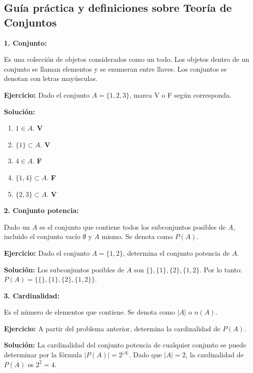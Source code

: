 \documentclass[11pt, a4paper]{article}
\begin{document}
  \subsection{Guía práctica y definiciones sobre Teoría de Conjuntos}
  \begin{multicols}{2}
    \begin{center}
      \textbf{1. Conjunto:}
    \end{center}
    Es una colección de objetos considerados como un todo. Los objetos dentro de un conjunto se llaman elementos y se enumeran entre llaves. Los conjuntos se denotan con letras mayúsculas.

    \textbf{Ejercicio:} Dado el conjunto \( A = \{1, 2, 3\} \), marca V o F según corresponda.

    \textbf{Solución:} 
    \begin{enumerate}
      \item \( 1 \in A \). \quad \textbf{V}
    \item \( \{1\} \subset A \). \quad \textbf{V}
    \item \( 4 \in A \). \quad \textbf{F}
    \item \( \{1, 4\} \subset A \). \quad \textbf{F}
    \item \( \{2, 3\} \subset A \). \quad \textbf{V}
  \end{enumerate}

    \begin{center}
      \textbf{2. Conjunto potencia:}
    \end{center}
    Dado un \( A \) es el conjunto que contiene todos los subconjuntos posibles de \( A \), incluido el conjunto vacío $\emptyset$ y \( A \) mismo. Se denota como \( P(A) \).
  
    \textbf{Ejercicio:} Dado el conjunto \( A = \{1, 2\} \), determina el conjunto potencia de \( A \).
  
    \textbf{Solución:} Los subconjuntos posibles de \( A \) son \( \{\}, \{1\}, \{2\}, \{1, 2\} \). Por lo tanto: \( P(A) = \{\{\}, \{1\}, \{2\}, \{1, 2\}\} \).

    \begin{center}
      \textbf{3. Cardinalidad:}
    \end{center}
    Es el número de elementos que contiene. Se denota como \( |A| \) o \( n(A) \).
    
    \textbf{Ejercicio:} A partir del problema anterior, determina la cardinalidad de \( P(A) \).
    
    \textbf{Solución:} La cardinalidad del conjunto potencia de cualquier conjunto se puede determinar por la fórmula \( |P(A)| = 2^{|A|} \). Dado que \( |A| = 2 \), la cardinalidad de \( P(A) \) es \( 2^2 = 4 \).


\end{multicols}
\end{document}
